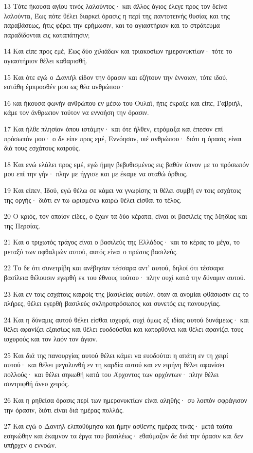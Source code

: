 \par 13 Τότε ήκουσα αγίου τινός λαλούντος· και άλλος άγιος έλεγε προς τον δείνα λαλούντα, Έως πότε θέλει διαρκεί όρασις η περί της παντοτεινής θυσίας και της παραβάσεως, ήτις φέρει την ερήμωσιν, και το αγιαστήριον και το στράτευμα παραδίδονται εις καταπάτησιν;
\par 14 Και είπε προς εμέ, Έως δύο χιλιάδων και τριακοσίων ημερονυκτίων· τότε το αγιαστήριον θέλει καθαρισθή.
\par 15 Και ότε εγώ ο Δανιήλ είδον την όρασιν και εζήτουν την έννοιαν, τότε ιδού, εστάθη έμπροσθέν μου ως θέα ανθρώπου·
\par 16 και ήκουσα φωνήν ανθρώπου εν μέσω του Ουλαΐ, ήτις έκραξε και είπε, Γαβριήλ, κάμε τον άνθρωπον τούτον να εννοήση την όρασιν.
\par 17 Και ήλθε πλησίον όπου ιστάμην· και ότε ήλθεν, ετρόμαξα και έπεσον επί πρόσωπόν μου· ο δε είπε προς εμέ, Εννόησον, υιέ ανθρώπου· διότι η όρασις είναι διά τους εσχάτους καιρούς.
\par 18 Και ενώ ελάλει προς εμέ, εγώ ήμην βεβυθισμένος εις βαθύν ύπνον με το πρόσωπόν μου επί την γήν· πλην με ήγγισε και με έκαμε να σταθώ όρθιος.
\par 19 Και είπεν, Ιδού, εγώ θέλω σε κάμει να γνωρίσης τι θέλει συμβή εν τοις εσχάτοις της οργής· διότι εν τω ωρισμένω καιρώ θέλει είσθαι το τέλος.
\par 20 Ο κριός, τον οποίον είδες, ο έχων τα δύο κέρατα, είναι οι βασιλείς της Μηδίας και της Περσίας.
\par 21 Και ο τριχωτός τράγος είναι ο βασιλεύς της Ελλάδος· και το κέρας το μέγα, το μεταξύ των οφθαλμών αυτού, αυτός είναι ο πρώτος βασιλεύς.
\par 22 Το δε ότι συνετρίβη και ανέβησαν τέσσαρα αντ' αυτού, δηλοί ότι τέσσαρα βασίλεια θέλουσιν εγερθή εκ του έθνους τούτου· πλην ουχί κατά την δύναμιν αυτού.
\par 23 Και εν τοις εσχάτοις καιροίς της βασιλείας αυτών, όταν αι ανομίαι φθάσωσιν εις το πλήρες, θέλει εγερθή βασιλεύς σκληροπρόσωπος και συνετός εις πανουργίας.
\par 24 Και η δύναμις αυτού θέλει είσθαι ισχυρά, ουχί όμως εξ ιδίας αυτού δυνάμεως· και θέλει αφανίζει εξαισίως και θέλει ευοδούσθαι και κατορθόνει και θέλει αφανίζει τους ισχυρούς και τον λαόν τον άγιον.
\par 25 Και διά της πανουργίας αυτού θέλει κάμει να ευοδούται η απάτη εν τη χειρί αυτού· και θέλει μεγαλυνθή εν τη καρδία αυτού και εν ειρήνη θέλει αφανίσει πολλούς· και θέλει σηκωθή κατά του Άρχοντος των αρχόντων· πλην θέλει συντριφθή άνευ χειρός.
\par 26 Και η ρηθείσα όρασις περί των ημερονυκτίων είναι αληθής· συ λοιπόν σφράγισον την όρασιν, διότι είναι διά ημέρας πολλάς.
\par 27 Και εγώ ο Δανιήλ ελιποθύμησα και ήμην ασθενής ημέρας τινάς· μετά ταύτα εσηκώθην και έκαμνον τα έργα του βασιλέως· εθαύμαζον δε διά την όρασιν και δεν υπήρχεν ο εννοών.


